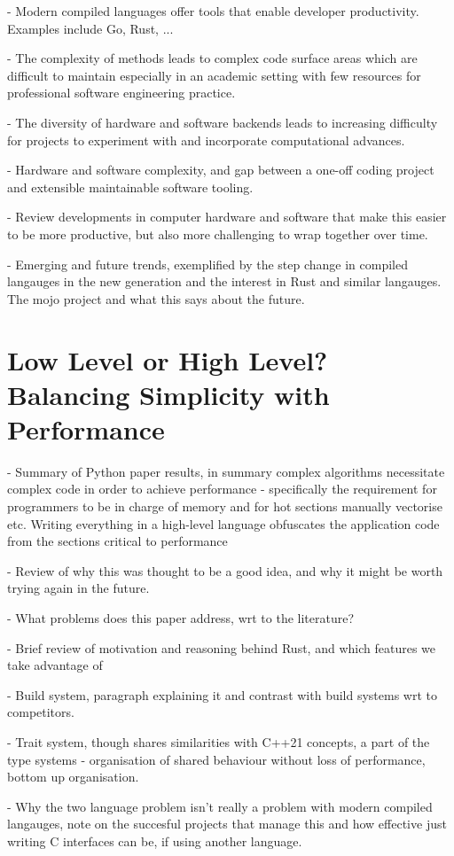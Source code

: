 - Modern compiled languages offer tools that enable developer productivity. Examples include Go, Rust, ...

- The complexity of methods leads to complex code surface areas which are difficult to maintain especially in an academic setting with few resources for professional software engineering practice.

- The diversity of hardware and software backends leads to increasing difficulty for projects to experiment with and incorporate computational advances.

- Hardware and software complexity, and gap between a one-off coding project and extensible maintainable software tooling.

- Review developments in computer hardware and software that make this easier to be more productive, but also more challenging to wrap together over time.

- Emerging and future trends, exemplified by the step change in compiled langauges in the new generation and the interest in Rust and similar langauges. The mojo project and what this says about the future.


\section{Low Level or High Level? Balancing Simplicity with Performance}

- Summary of Python paper results, in summary complex algorithms necessitate complex code in order to achieve performance - specifically the requirement for programmers to be in charge of memory and for hot sections manually vectorise etc. Writing everything in a high-level language obfuscates the application code from the sections critical to performance

- Review of why this was thought to be a good idea, and why it might be worth trying again in the future.

- What problems does this paper address, wrt to the literature?

- Brief review of motivation and reasoning behind Rust, and which features we take advantage of

- Build system, paragraph explaining it and contrast with build systems wrt to competitors.

- Trait system, though shares similarities with C++21 concepts, a part of the type systems
    - organisation of shared behaviour without loss of performance, bottom up organisation.



- Why the two language problem isn't really a problem with modern compiled langauges, note on the succesful projects that manage this and how effective just writing C interfaces can be, if using another language.


